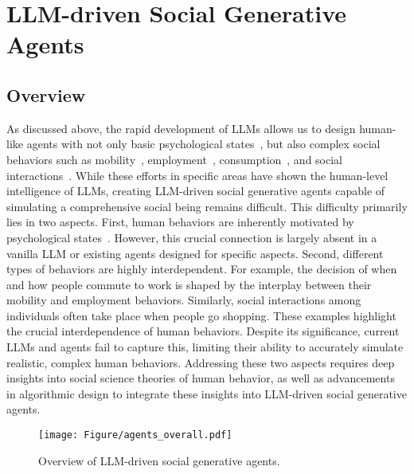 \section{LLM-driven Social Generative Agents}\label{sec:social_agents}


\subsection{Overview}


As discussed above, the rapid development of LLMs allows us to design human-like agents with not only basic psychological states~\cite{abdurahman2024perils,strachan2024testing}, but also complex social behaviors such as mobility~\cite{shao2024beyond,yan2024opencity,feng2024agentmove}, employment~\cite{li2024econagent,horton2023large}, consumption~\cite{li2024econagent,horton2023large}, and social interactions~\cite{gao2023s,park2023generative}. While these efforts in specific areas have shown the human-level intelligence of LLMs, creating LLM-driven social generative agents capable of simulating a comprehensive social being remains difficult. This difficulty primarily lies in two aspects. First, human behaviors are inherently motivated by psychological states~\cite{eysenck2020cognitive,mcleod2007maslow,maslow1943theory,ajzen1991theory}. However, this crucial connection is largely absent in a vanilla LLM or existing agents designed for specific aspects. Second, different types of behaviors are highly interdependent. For example, the decision of when and how people commute to work is shaped by the interplay between their mobility and employment behaviors. Similarly, social interactions among individuals often take place when people go shopping. These examples highlight the crucial interdependence of human behaviors. Despite its significance, current LLMs and agents fail to capture this, limiting their ability to accurately simulate realistic, complex human behaviors. Addressing these two aspects requires deep insights into social science theories of human behavior, as well as advancements in algorithmic design to integrate these insights into LLM-driven social generative agents.

\begin{figure}[t]
\centering
\texttt{[image: Figure/agents\_overall.pdf]}
\caption{Overview of LLM-driven social generative agents.}
\label{fig:overall_agents}
\end{figure}



